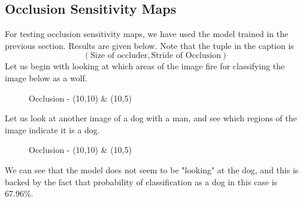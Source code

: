 \subsection{Occlusion Sensitivity Maps}
For testing occlusion sensitivity maps, we have used the model trained in the previous section. Results are given below. Note that the tuple in the caption is 
\[(\text{Size of occluder},\text{Stride of Occlusion})\]
Let us begin with looking at which areas of the image fire for classifying the image below as a wolf.
\begin{figure}[H]
    \centering
    \qquad
    \qquad
    \caption[Short text]{Occlusion - (10,10) \& (10,5)}
\end{figure}
Let us look at another image of a dog with a man, and see which regions of the image indicate it is a dog.
\begin{figure}[H]
    \centering
    \qquad
    \qquad
    \caption[Short text]{Occlusion - (10,10) \& (10,5)}
\end{figure}
We can see that the model does not seem to be "looking" at the dog, and this is backed by the fact that probability of classification as a dog in this case is 67.96\%.